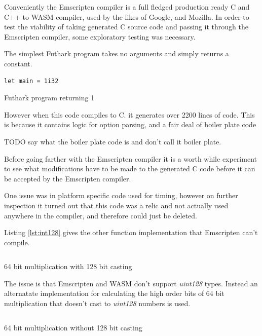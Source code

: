\documentclass[11pt]{book}
\begin{document}
Conveniently the Emscripten compiler is a full fledged production ready C and C++ to WASM compiler, used by the likes of Google, and Mozilla. In order to test the viability of taking generated C source code and passing it through the Emscripten compiler, some exploratory testing was necessary.

The simplest Futhark program takes no arguments and simply returns a constant. 
\begin{listing}[H]
\begin{verbatim}
let main = 1i32
\end{verbatim}
\caption{Futhark program returning 1}
\label{lst:simp}
\end{listing}



However when this code compiles to C. it generates over 2200 lines of code. This is because it contains logic for option parsing, and a fair deal of boiler plate code

TODO say what the boiler plate code is and don't call it boiler plate.


Before going farther with the Emscripten compiler it is a worth while experiment to see what modifications have to be made to the generated C code before it can be accepted by the Emscripten compiler.

One issue was in platform specific code used for timing, however on further inspection it turned out that this code was a relic and not actually used anywhere in the compiler, and therefore could just be deleted.

Listing \ref{lst:int128} gives the other function implementation that Emscripten can't compile.
\begin{listing}[H] 
        \inputminted[fontsize=\small,baselinestretch=0.5,linenos]{C}{code/compiler/int128_c.c}
        \caption{64 bit multiplication with 128 bit casting}
        \label{lst:int128}    
\end{listing} 

The issue is that Emscripten and WASM don't support \textit{uint128} types. Instead an alternatate implementation for calculating the high order bits of 64 bit multiplication that doesn't cast to \textit{uint128} numbers is used. 

\begin{listing}[H] 
        \inputminted[fontsize=\small,baselinestretch=0.5,linenos]{C}{code/compiler/int128_wasm.c}
        \caption{64 bit multiplication without 128 bit casting}
        \label{lst:integrate-js}    
\end{listing} 
\end{document}
